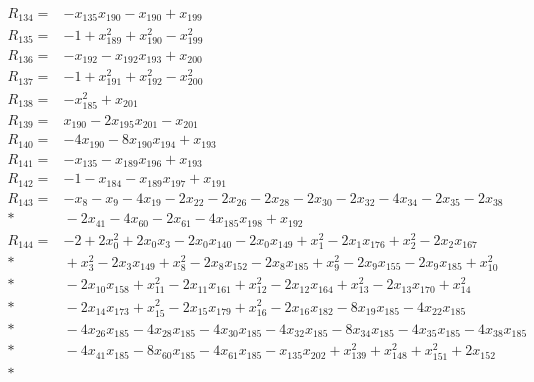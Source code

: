 \documentclass[11pt]{article}
\theoremstyle{remark}\newtheorem{remark}[theorem]{Remark}
\begin{document}
\begin{align*}
R_{134} ={}& -x_{135}x_{190} - x_{190} + x_{199} \\[4pt]
R_{135} ={}& -1 + x_{189}^{2} + x_{190}^{2} - x_{199}^{2} \\[4pt]
R_{136} ={}& -x_{192} - x_{192}x_{193} + x_{200} \\[4pt]
R_{137} ={}& -1 + x_{191}^{2} + x_{192}^{2} - x_{200}^{2} \\[4pt]
R_{138} ={}& -x_{185}^{2} + x_{201} \\[4pt]
R_{139} ={}& x_{190} - 2x_{195}x_{201} - x_{201} \\[4pt]
R_{140} ={}& -4x_{190} - 8x_{190}x_{194} + x_{193} \\[4pt]
R_{141} ={}& -x_{135} - x_{189}x_{196} + x_{193} \\[4pt]
R_{142} ={}& -1 - x_{184} - x_{189}x_{197} + x_{191} \\[4pt]
R_{143} ={}& -x_{8} - x_{9} - 4x_{19} - 2x_{22} - 2x_{26} - 2x_{28} - 2x_{30} - 2x_{32} - 4x_{34} - 2x_{35} - 2x_{38} \\*
&{} - 2x_{41} - 4x_{60} - 2x_{61} - 4x_{185}x_{198} + x_{192} \\[4pt]
R_{144} ={}& -2 + 2x_{0}^{2} + 2x_{0}x_{3} - 2x_{0}x_{140} - 2x_{0}x_{149} + x_{1}^{2} - 2x_{1}x_{176} + x_{2}^{2} - 2x_{2}x_{167} \\*
&{} + x_{3}^{2} - 2x_{3}x_{149} + x_{8}^{2} - 2x_{8}x_{152} - 2x_{8}x_{185} + x_{9}^{2} - 2x_{9}x_{155} - 2x_{9}x_{185} + x_{10}^{2} \\*
&{} - 2x_{10}x_{158} + x_{11}^{2} - 2x_{11}x_{161} + x_{12}^{2} - 2x_{12}x_{164} + x_{13}^{2} - 2x_{13}x_{170} + x_{14}^{2} \\*
&{} - 2x_{14}x_{173} + x_{15}^{2} - 2x_{15}x_{179} + x_{16}^{2} - 2x_{16}x_{182} - 8x_{19}x_{185} - 4x_{22}x_{185} \\*
&{} - 4x_{26}x_{185} - 4x_{28}x_{185} - 4x_{30}x_{185} - 4x_{32}x_{185} - 8x_{34}x_{185} - 4x_{35}x_{185} - 4x_{38}x_{185} \\*
&{} - 4x_{41}x_{185} - 8x_{60}x_{185} - 4x_{61}x_{185} - x_{135}x_{202} + x_{139}^{2} + x_{148}^{2} + x_{151}^{2} + 2x_{152} \\*

\end{align*}
\end{document}
